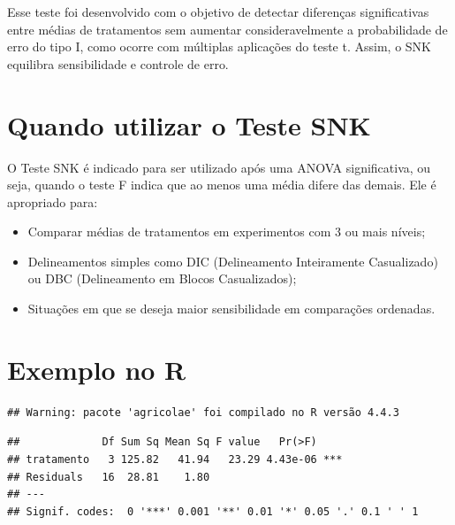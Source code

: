 \documentclass[
]{article}
\begin{document}
Esse teste foi desenvolvido com o objetivo de detectar diferenças
significativas entre médias de tratamentos sem aumentar
consideravelmente a probabilidade de erro do tipo I, como ocorre com
múltiplas aplicações do teste t. Assim, o SNK equilibra sensibilidade e
controle de erro.

\section{Quando utilizar o Teste SNK}\label{quando-utilizar-o-teste-snk}

O Teste SNK é indicado para ser utilizado após uma ANOVA significativa,
ou seja, quando o teste F indica que ao menos uma média difere das
demais. Ele é apropriado para:

\begin{itemize}
\item
  Comparar médias de tratamentos em experimentos com 3 ou mais níveis;
\item
  Delineamentos simples como DIC (Delineamento Inteiramente Casualizado)
  ou DBC (Delineamento em Blocos Casualizados);
\item
  Situações em que se deseja maior sensibilidade em comparações
  ordenadas.
\end{itemize}

\section{Exemplo no R}\label{exemplo-no-r}

\begin{verbatim}
## Warning: pacote 'agricolae' foi compilado no R versão 4.4.3
\end{verbatim}

\begin{verbatim}
##             Df Sum Sq Mean Sq F value   Pr(>F)    
## tratamento   3 125.82   41.94   23.29 4.43e-06 ***
## Residuals   16  28.81    1.80                     
## ---
## Signif. codes:  0 '***' 0.001 '**' 0.01 '*' 0.05 '.' 0.1 ' ' 1
\end{verbatim}
\end{document}
